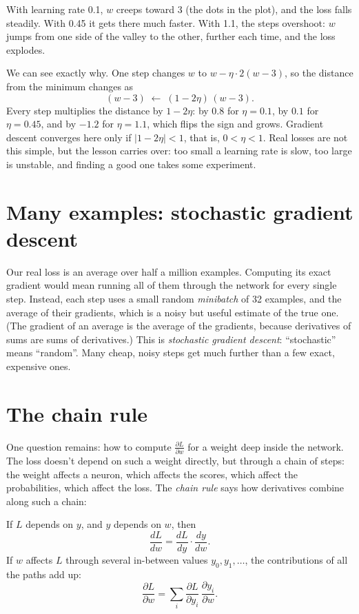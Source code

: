 \documentclass[11pt,a4paper,oneside,openany]{book}
\newcommand{\pd}[2]{\frac{\partial #1}{\partial #2}}
\begin{document}
With learning rate 0.1, $w$ creeps toward 3 (the dots in the plot), and
the loss falls steadily. With 0.45 it gets there much faster. With 1.1,
the steps overshoot: $w$ jumps from one side of the valley to the other,
further each time, and the loss explodes.

We can see exactly why. One step changes $w$ to
$w - \eta\cdot 2(w - 3)$, so the distance from the minimum changes as
\[
  (w - 3) \;\leftarrow\; (1 - 2\eta)\,(w - 3).
\]
Every step multiplies the distance by $1 - 2\eta$: by $0.8$ for
$\eta = 0.1$, by $0.1$ for $\eta = 0.45$, and by $-1.2$ for $\eta = 1.1$,
which flips the sign and grows. Gradient descent converges here only if
$|1 - 2\eta| < 1$, that is, $0 < \eta < 1$. Real losses are not this
simple, but the lesson carries over: too small a learning rate is slow,
too large is unstable, and finding a good one takes some experiment.

\section{Many examples: stochastic gradient descent}

Our real loss is an average over half a million examples. Computing its
exact gradient would mean running all of them through the network for
every single step. Instead, each step uses a small random \emph{minibatch}
of 32 examples, and the average of their gradients, which is a noisy but
useful estimate of the true one. (The gradient of an average is the
average of the gradients, because derivatives of sums are sums of
derivatives.) This is \emph{stochastic gradient descent}: ``stochastic''
means ``random''. Many cheap, noisy steps get much further than a few
exact, expensive ones.

\section{The chain rule}

One question remains: how to compute $\pd{L}{w}$ for a weight deep inside
the network. The loss doesn't depend on such a weight directly, but
through a chain of steps: the weight affects a neuron, which affects the
scores, which affect the probabilities, which affect the loss. The
\emph{chain rule} says how derivatives combine along such a chain:

\begin{mathbox}
If $L$ depends on $y$, and $y$ depends on $w$, then
\[
  \frac{dL}{dw} = \frac{dL}{dy}\cdot\frac{dy}{dw}.
\]
If $w$ affects $L$ through several in-between values $y_0, y_1, \dots$, the
contributions of all the paths add up:
\[
  \pd{L}{w} = \sum_i \pd{L}{y_i}\,\pd{y_i}{w} .
\]
\end{mathbox}
\end{document}
